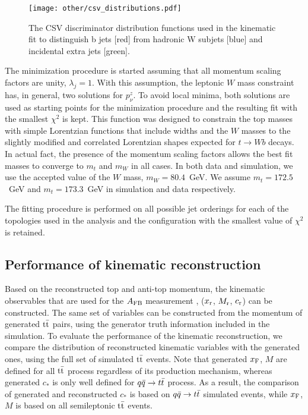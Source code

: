 \begin{figure}[hbt]
  \begin{center}
    \texttt{[image: other/csv\_distributions.pdf]}
  \caption{\small The CSV discriminator distribution functions used in the kinematic fit to distinguish b jets [red] from hadronic W subjets [blue] and incidental extra jets [green].}
    \label{fig:CSV_distributions}
  \end{center}
\end{figure}

The minimization procedure is started assuming that all momentum scaling factors are unity, $\lambda_j=1$.  With this assumption, the leptonic $W$ mass constraint has, in general, two solutions for $p_\nu^z$.  To avoid local minima, both solutions are used as starting points for the minimization procedure and the resulting fit with the smallest $\chi^2$ is kept.  This function was designed to constrain the top masses with simple Lorentzian functions that include widths and the $W$ masses to the slightly modified and correlated Lorentzian shapes expected for $t\to Wb$ decays.  In actual fact, the presence of the momentum scaling factors allows the best fit masses to converge to $m_t$ and $m_W$ in all cases. In both data and simulation, we use the accepted value of the $W$ mass, $m_W = 80.4$~GeV. We assume $m_t=172.5$~GeV and $m_t=173.3$~GeV in simulation and data respectively.

The fitting procedure is performed on all possible jet orderings for each of the topologies used in the analysis and the configuration with the smallest value of $\chi^2$ is retained. 

\subsection{Performance of kinematic reconstruction}

Based on the reconstructed top and anti-top momentum, the kinematic observables that are used for the $A_{\mathrm{FB}}$ measurement , ($x_\mathrm{r}$, $M_\mathrm{r}$, $c_\mathrm{r}$) can be constructed. The same set of variables can be constructed from the momentum of generated $\mathrm{t}\bar{\mathrm{t}}$ pairs, using the generator truth information included in the simulation. To evaluate the performance of the kinematic reconstruction, we compare the distribution of reconstructed kinematic variables with the generated ones, using the full set of simulated $\mathrm{t}\bar{\mathrm{t}}$ events. Note that generated $x_\mathrm{F}$, $M$ are defined for all $\mathrm{t}\bar{\mathrm{t}}$ process regardless of its production mechanism, whereas generated $c_*$ is only well defined for $q\bar q \rightarrow t \bar t$ process. As a result, the comparison of generated and reconstructed $c_*$ is based on $q\bar q \rightarrow t \bar t$ simulated events, while $x_\mathrm{F}$, $M$ is based on all semileptonic $\mathrm{t}\bar{\mathrm{t}}$ events. 

